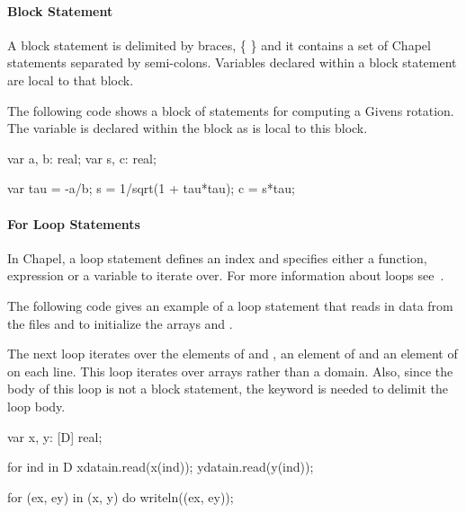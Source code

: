 \paragraph{Block Statement}  
A block statement is delimited by braces, \{ \} and it
contains a set of Chapel statements separated by semi-colons.  
Variables declared within a block statement are local to that block.

\begin{example}
The following code shows a block of statements for computing
a Givens rotation.  The variable  is declared 
within the block as is local to this block.
\begin{chapel}

var a, b: real;
var s, c: real;

{
  var tau = -a/b;
  s = 1/sqrt(1 + tau*tau);
  c = s*tau;
}

\end{chapel} 
\end{example} 

\paragraph{For Loop Statements} 
In Chapel, a  loop statement defines an index and
specifies either a function, expression or a variable to
iterate over.  For more information about  loops
see~.

\begin{example}
The following code gives an example of a  loop
statement that reads in data from the files 
and  to initialize the arrays  and
.  

The next  loop iterates over the elements of 
 and , an element of  and an element
of  on each line.  This loop iterates over arrays rather
than a domain.  Also, since the body of this loop is not a block
statement, the keyword  is needed to delimit the loop
body. 
\begin{chapel}

var x, y: [D] real;

for ind in D { 
  xdatain.read(x(ind));
  ydatain.read(y(ind));
}

for (ex, ey) in (x, y) do 
  writeln((ex, ey));

\end{chapel}
\end{example}

